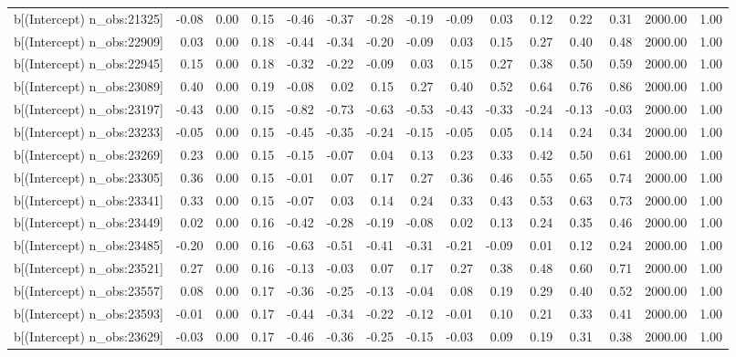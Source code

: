 \begin{table}[ht]
\begin{tabular}{rrrrrrrrrrrrrrr}
  b[(Intercept) n\_obs:21325] & -0.08 & 0.00 & 0.15 & -0.46 & -0.37 & -0.28 & -0.19 & -0.09 & 0.03 & 0.12 & 0.22 & 0.31 & 2000.00 & 1.00 \\ 
  b[(Intercept) n\_obs:22909] & 0.03 & 0.00 & 0.18 & -0.44 & -0.34 & -0.20 & -0.09 & 0.03 & 0.15 & 0.27 & 0.40 & 0.48 & 2000.00 & 1.00 \\ 
  b[(Intercept) n\_obs:22945] & 0.15 & 0.00 & 0.18 & -0.32 & -0.22 & -0.09 & 0.03 & 0.15 & 0.27 & 0.38 & 0.50 & 0.59 & 2000.00 & 1.00 \\ 
  b[(Intercept) n\_obs:23089] & 0.40 & 0.00 & 0.19 & -0.08 & 0.02 & 0.15 & 0.27 & 0.40 & 0.52 & 0.64 & 0.76 & 0.86 & 2000.00 & 1.00 \\ 
  b[(Intercept) n\_obs:23197] & -0.43 & 0.00 & 0.15 & -0.82 & -0.73 & -0.63 & -0.53 & -0.43 & -0.33 & -0.24 & -0.13 & -0.03 & 2000.00 & 1.00 \\ 
  b[(Intercept) n\_obs:23233] & -0.05 & 0.00 & 0.15 & -0.45 & -0.35 & -0.24 & -0.15 & -0.05 & 0.05 & 0.14 & 0.24 & 0.34 & 2000.00 & 1.00 \\ 
  b[(Intercept) n\_obs:23269] & 0.23 & 0.00 & 0.15 & -0.15 & -0.07 & 0.04 & 0.13 & 0.23 & 0.33 & 0.42 & 0.50 & 0.61 & 2000.00 & 1.00 \\ 
  b[(Intercept) n\_obs:23305] & 0.36 & 0.00 & 0.15 & -0.01 & 0.07 & 0.17 & 0.27 & 0.36 & 0.46 & 0.55 & 0.65 & 0.74 & 2000.00 & 1.00 \\ 
  b[(Intercept) n\_obs:23341] & 0.33 & 0.00 & 0.15 & -0.07 & 0.03 & 0.14 & 0.24 & 0.33 & 0.43 & 0.53 & 0.63 & 0.73 & 2000.00 & 1.00 \\ 
  b[(Intercept) n\_obs:23449] & 0.02 & 0.00 & 0.16 & -0.42 & -0.28 & -0.19 & -0.08 & 0.02 & 0.13 & 0.24 & 0.35 & 0.46 & 2000.00 & 1.00 \\ 
  b[(Intercept) n\_obs:23485] & -0.20 & 0.00 & 0.16 & -0.63 & -0.51 & -0.41 & -0.31 & -0.21 & -0.09 & 0.01 & 0.12 & 0.24 & 2000.00 & 1.00 \\ 
  b[(Intercept) n\_obs:23521] & 0.27 & 0.00 & 0.16 & -0.13 & -0.03 & 0.07 & 0.17 & 0.27 & 0.38 & 0.48 & 0.60 & 0.71 & 2000.00 & 1.00 \\ 
  b[(Intercept) n\_obs:23557] & 0.08 & 0.00 & 0.17 & -0.36 & -0.25 & -0.13 & -0.04 & 0.08 & 0.19 & 0.29 & 0.40 & 0.52 & 2000.00 & 1.00 \\ 
  b[(Intercept) n\_obs:23593] & -0.01 & 0.00 & 0.17 & -0.44 & -0.34 & -0.22 & -0.12 & -0.01 & 0.10 & 0.21 & 0.33 & 0.41 & 2000.00 & 1.00 \\ 
  b[(Intercept) n\_obs:23629] & -0.03 & 0.00 & 0.17 & -0.46 & -0.36 & -0.25 & -0.15 & -0.03 & 0.09 & 0.19 & 0.31 & 0.38 & 2000.00 & 1.00 \\ 

\end{tabular}
\end{table}

